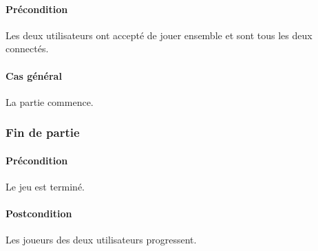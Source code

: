 \paragraph{Précondition} Les deux utilisateurs ont accepté de jouer ensemble et sont tous les deux connectés.
\paragraph{Cas général} La partie commence.

\subsubsection{Fin de partie}

\paragraph{Précondition} Le jeu est terminé.
\paragraph{Postcondition} Les joueurs des deux utilisateurs progressent.
